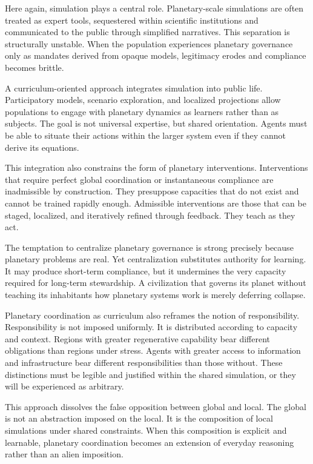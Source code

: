\documentclass[12pt,oneside]{book}
\begin{document}
Here again, simulation plays a central role. Planetary-scale simulations are often treated as expert tools, sequestered within scientific institutions and communicated to the public through simplified narratives. This separation is structurally unstable. When the population experiences planetary governance only as mandates derived from opaque models, legitimacy erodes and compliance becomes brittle.

A curriculum-oriented approach integrates simulation into public life. Participatory models, scenario exploration, and localized projections allow populations to engage with planetary dynamics as learners rather than as subjects. The goal is not universal expertise, but shared orientation. Agents must be able to situate their actions within the larger system even if they cannot derive its equations.

This integration also constrains the form of planetary interventions. Interventions that require perfect global coordination or instantaneous compliance are inadmissible by construction. They presuppose capacities that do not exist and cannot be trained rapidly enough. Admissible interventions are those that can be staged, localized, and iteratively refined through feedback. They teach as they act.

The temptation to centralize planetary governance is strong precisely because planetary problems are real. Yet centralization substitutes authority for learning. It may produce short-term compliance, but it undermines the very capacity required for long-term stewardship. A civilization that governs its planet without teaching its inhabitants how planetary systems work is merely deferring collapse.

Planetary coordination as curriculum also reframes the notion of responsibility. Responsibility is not imposed uniformly. It is distributed according to capacity and context. Regions with greater regenerative capability bear different obligations than regions under stress. Agents with greater access to information and infrastructure bear different responsibilities than those without. These distinctions must be legible and justified within the shared simulation, or they will be experienced as arbitrary.

This approach dissolves the false opposition between global and local. The global is not an abstraction imposed on the local. It is the composition of local simulations under shared constraints. When this composition is explicit and learnable, planetary coordination becomes an extension of everyday reasoning rather than an alien imposition.
\end{document}
